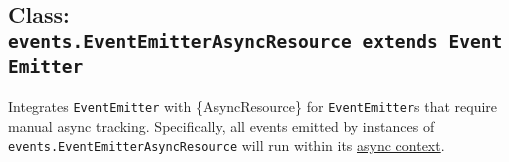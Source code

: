 \begin{Shaded}
\begin{Highlighting}[]
 \OperatorTok{;}

 
  \OperatorTok{;}
  \NormalTok{ \{}
\NormalTok{(}\OperatorTok{,}\KeywordTok{=\textgreater{}}\NormalTok{())}\OperatorTok{;}
\OperatorTok{=} \OperatorTok{,}\KeywordTok{=\textgreater{}}\NormalTok{ \{}
\NormalTok{    \})}\OperatorTok{;}
\NormalTok{  \} }\NormalTok{ \{}
\NormalTok{[}\NormalTok{]()}\OperatorTok{;}
\NormalTok{  \}}
\NormalTok{\}}
\end{Highlighting}
\end{Shaded}

\subsection{\texorpdfstring{Class:
\texttt{events.EventEmitterAsyncResource\ extends\ EventEmitter}}{Class: events.EventEmitterAsyncResource extends EventEmitter}}\label{class-events.eventemitterasyncresource-extends-eventemitter}

Integrates \texttt{EventEmitter} with \{AsyncResource\} for
\texttt{EventEmitter}s that require manual async tracking. Specifically,
all events emitted by instances of
\texttt{events.EventEmitterAsyncResource} will run within its
\href{async_context.md}{async context}.

